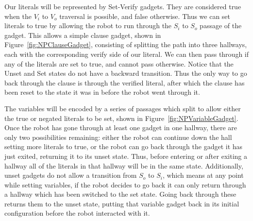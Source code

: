 Our literals will be represented by Set-Verify gadgets. They are considered true when the $V_i$ to $V_o$ traversal is possible, and false otherwise. Thus we can set literals to true by allowing the robot to run through the $S_i$ to $S_o$ passage of the gadget. This allows a simple clause gadget, shown in Figure~\ref{fig:NPClauseGadget}, consisting of splitting the path into three hallways, each with the corresponding verify side of our literal. We can then pass through if any of the literals are set to true, and cannot pass otherwise. Notice that the Unset and Set states do not have a backward transition. Thus the only way to go back through the clause is through the verified literal, after which the clause has been reset to the state it was in before the robot went through it.

The variables will be encoded by a series of passages which split to allow either the true or negated literals to be set, shown in Figure~\ref{fig:NPVariableGadget}. Once the robot has gone through at least one gadget in one hallway, there are only two possibilities remaining: either the robot can continue down the hall setting more literals to true, or the robot can go back through the gadget it has just exited, returning it to its unset state. Thus, before entering or after exiting a hallway all of the literals in that hallway will be in the same state. Additionally, unset gadgets do not allow a transition from $S_o$ to $S_i$, which means at any point while setting variables, if the robot decides to go back it can only return through a hallway which has been switched to the set state. Going back through these returns them to the unset state, putting that variable gadget back in its initial configuration before the robot interacted with it.



